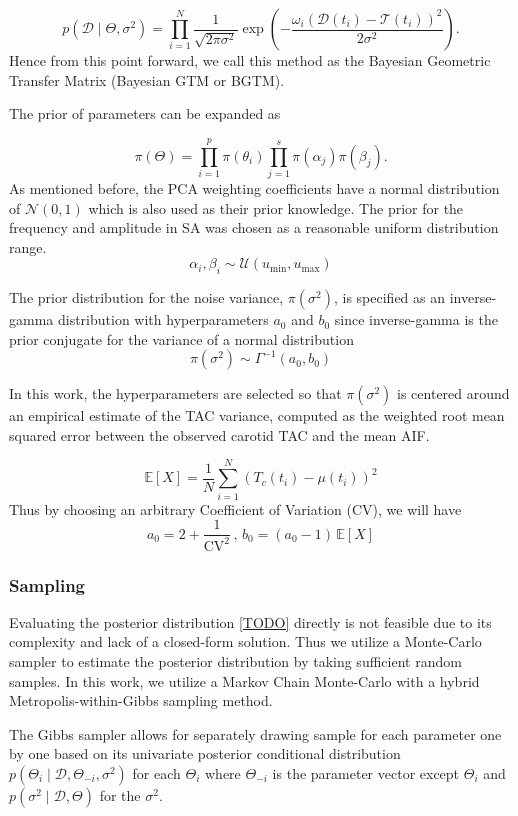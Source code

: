 \[
	p(\mathcal{D} \mid \Theta,\sigma^2) = \prod_{i=1}^N \frac{1}{\sqrt{2\pi \sigma^2}} \exp\left( -\frac{\omega_i(\mathcal{D}(t_i) - \mathcal{T}(t_i))^2}{2\sigma^2} \right).
\]
Hence from this point forward, we call this method as the Bayesian Geometric Transfer Matrix (Bayesian GTM or BGTM).

The prior of parameters can be expanded as

\[
	\pi(\Theta) = \prod_{i=1}^p \pi(\theta_i)  \prod_{j=1}^s \pi(\alpha_j) \pi(\beta_j).
\]
As mentioned before, the PCA weighting coefficients have a normal distribution of $\mathcal{N}(0,1)$ which is also used as their prior knowledge.
The prior for the frequency and amplitude in SA was chosen as a reasonable uniform distribution range.
\[
	\alpha_i,\beta_i \sim \mathcal{U}( u_{\text{min}} , u_{\text{max}} )
\]

The prior distribution for the noise variance, $\pi(\sigma^2)$, is specified as an inverse-gamma distribution with hyperparameters $a_0$ and $b_0$ since inverse-gamma is the prior conjugate for the variance of a normal distribution
\[
    \pi(\sigma^2) \sim \Gamma^{-1}(a_0,b_0)
\]

In this work, the hyperparameters are selected so that $\pi(\sigma^2)$ is centered around an empirical estimate of the TAC variance, computed as the weighted root mean squared error between the observed carotid TAC and the mean AIF.

\[
	\mathbb{E}[X] = \frac{1}{N} \sum_{i=1}^{N} (T_c(t_i) - \mu(t_i))^2
\]
Thus by choosing an arbitrary Coefficient of Variation (CV), we will have
\[
	a_0 = 2 + \frac{1}{\mathrm{CV}^2}\, , \, b_0 = (a_0 - 1) \, \mathbb{E}[X]
\]
\subsubsection{Sampling}

Evaluating the posterior distribution \ref{TODO} directly is not feasible due to its complexity and lack of a closed-form solution.
Thus we utilize a Monte-Carlo sampler to estimate the posterior distribution by taking sufficient random samples.
In this work, we utilize a Markov Chain Monte-Carlo with a hybrid Metropolis-within-Gibbs sampling method.

The Gibbs sampler allows for separately drawing sample for each parameter one by one based on its univariate posterior conditional distribution $p(\Theta_i \mid \mathcal{D}, \Theta_{-i}, \sigma^2)$ for each $\Theta_i$ where $\Theta_{-i}$ is the parameter vector except $\Theta_i$ and $p(\sigma^2 \mid \mathcal{D},\Theta)$ for the $\sigma^2$.

